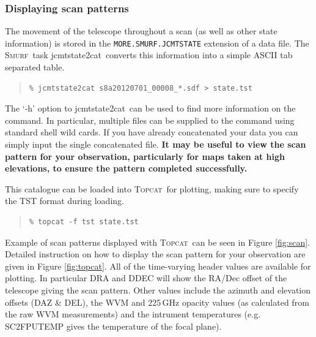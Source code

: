 \documentclass[twoside,11pt]{article}
\newcommand{\htmladdnormallink}[2]{#1}
\newcommand{\xref}[3]{#1}
\newcommand{\xlabel}[1]{}
\renewcommand{\_}{\texttt{\symbol{95}}}
\newenvironment{myquote}{\begin{quote}\begin{small}}{\end{small}\end{quote}}
\newcommand{\smurf}{\xref{\textsc{Smurf}}{sun258}{}}
\newcommand{\topcat}{\htmladdnormallink{\textsc{Topcat}}{http://www.starlink.ac.uk/topcat}}
\newcommand{\task}[1]{\textsf{#1}}
\newcommand{\jcmtstate}{\xref{\task{jcmtstate2cat}}{sun258}{JCMTSTATE2CAT}}
\begin{document}
\subsubsection{\xlabel{scan_pat}Displaying scan patterns}
\label{sec:scan}

The movement of the telescope throughout a scan (as well as other state information) is stored in the \texttt{MORE.SMURF.JCMTSTATE} extension of a data file. The \smurf\ task \jcmtstate\ converts this information into a simple ASCII tab separated table.

\begin{myquote}
\begin{verbatim}
% jcmtstate2cat s8a20120701_00008_*.sdf > state.tst
\end{verbatim}
\end{myquote}

The `-h' option to \jcmtstate\ can be used to find more information on the command. In particular, multiple files can be supplied to the command using standard shell wild cards. If you have already concatenated your data you can simply input the single concatenated file. \textbf{It may be useful to view the scan pattern for your observation, particularly for maps taken at high elevations, to ensure the pattern completed successfully.}


This catalogue can be loaded into \topcat\ for plotting, making sure
to specify the TST format during loading.

\begin{myquote}
\begin{verbatim}
% topcat -f tst state.tst
\end{verbatim}
\end{myquote}

Example of scan patterns displayed with \topcat\ can be seen in Figure \ref{fig:scan}. Detailed instruction on how to display the scan pattern for your observation are given in Figure \ref{fig:topcat}.  All of the time-varying header values are available for plotting. In particular DRA and DDEC will show the RA/Dec offset of the telescope giving the scan pattern. Other values include the azimuth and elevation offsets  (DAZ \& DEL), the WVM and 225\,GHz opacity values (as calculated from the raw WVM measurements) and the intrument temperatures (e.g. SC2\_FPUTEMP gives the temperature of the focal plane).
\end{document}
